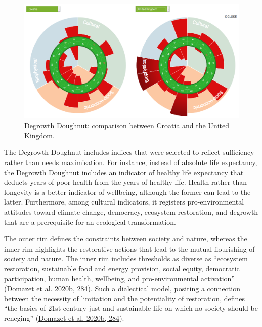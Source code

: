 \documentclass[a4paper, nobind]{templates/ociamthesis}
\begin{document}
\begin{figure}
\includegraphics[width=1\linewidth]{./figures/degrowth_doughnut} \caption[Degrowth Doughnut: comparison between Croatia and the United Kingdom.]{Degrowth Doughnut: comparison between Croatia and the United Kingdom.}\label{fig:unnamed-chunk-8}
\end{figure}

The Degrowth Doughnut includes indices that were selected to reflect sufficiency rather than needs maximisation. For instance, instead of absolute life expectancy, the Degrowth Doughnut includes an indicator of healthy life expectancy that deducts years of poor health from the years of healthy life. Health rather than longevity is a better indicator of wellbeing, although the former can lead to the latter. Furthermore, among cultural indicators, it registers pro-environmental attitudes toward climate change, democracy, ecosystem restoration, and degrowth that are a prerequisite for an ecological transformation.

The outer rim defines the constraints between society and nature, whereas the inner rim highlights the restorative actions that lead to the mutual flourishing of society and nature. The inner rim includes thresholds as diverse as ``ecosystem restoration, sustainable food and energy provision, social equity, democratic participation, human health, wellbeing, and pro-environmental activation'' (\protect\hyperlink{ref-domazet_mental_2020}{Domazet et al. 2020b, 284}). Such a dialectical model, positing a connection between the necessity of limitation and the potentiality of restoration, defines ``the basics of 21st century just and sustainable life on which no society should be reneging'' (\protect\hyperlink{ref-domazet_mental_2020}{Domazet et al. 2020b, 284}).
\end{document}
